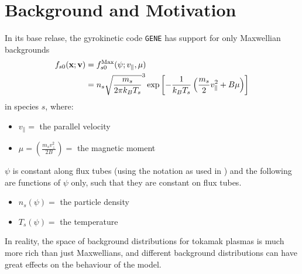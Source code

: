 \section{Background and Motivation}
    In its base relase, the gyrokinetic code {\tt GENE} has support for only Maxwellian backgrounds
    \begin{align}
        f_{s0}(\mathbf{x}; \mathbf{v})  &=  f_{s0}^{\rm Max}(\psi; v_{\parallel}, \mu)  \\
        &=  n_{s}\sqrt{\frac{m_{s}}{2\pi k_{B}T_{s}}}^{3}\exp\left[- \frac{1}{k_{B}T_{s}}\left(\frac{m_{s}}{2}v_{\parallel}^{2} + B\mu\right)\right]
    \end{align}
    in species $s$, where:
    \begin{itemize}
        \item  $v_{\parallel} =$ the parallel velocity
        \item  $\mu = \left(\frac{m_{s}v_{\perp}^{2}}{2B}\right) =$ the magnetic moment
    \end{itemize}
    $\psi$ is constant along flux tubes (using the notation as used in \cite{Abe+13}) and the following are functions of $\psi$ only, such that they are constant on flux tubes.
    \begin{itemize}
        \item  $n_{s}(\psi) =$ the particle density
        \item  $T_{s}(\psi) =$ the temperature
    \end{itemize}

    In reality, the space of background distributions for tokamak plasmas is much more rich than just Maxwellians, and different background distributions can have great effects on the behaviour of the model.
    
    
    
